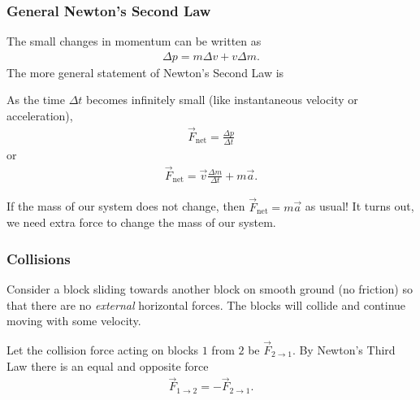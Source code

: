 \documentclass[20pt]{beamer}
\begin{document}
\begin{frame}
	\frametitle{General Newton's Second Law}
	The small changes in momentum can be written as
	\begin{align*}
		\Delta p = m \Delta v + v \Delta m.
	\end{align*}
	The more general statement of Newton's Second Law is
	\begin{theorem}
		As the time $\Delta t$ becomes infinitely small (like instantaneous velocity or acceleration),
		\begin{align*}
			\vec{F}_\mathrm{net} = \frac{\Delta p}{\Delta t}
		\end{align*}
		or
		\begin{align*}
			\vec{F}_\mathrm{net} = \vec{v} \frac{\Delta m}{\Delta t} + m \vec{a}.
		\end{align*}
	\end{theorem}
	If the mass of our system does not change, then $\vec{F}_\mathrm{net} = m \vec{a}$ as usual! It turns out, we need extra force to change the mass of our system.
\end{frame}

\begin{frame}
	\frametitle{Collisions}
	\begin{example}
		Consider a block sliding towards another block on smooth ground (no friction) so that there are no \textit{external} horizontal forces.
		The blocks will collide and continue moving with some velocity.
		\begin{figure}[ht]
			\centering
			\label{fig:collision}
		\end{figure}
		Let the collision force acting on blocks $1$ from $2$ be $\vec{F}_{2\rightarrow 1}$. By Newton's Third Law there is an equal and opposite force
		\begin{align*}
			\vec{F}_{1 \rightarrow 2} = - \vec{F}_{2 \rightarrow 1}.
		\end{align*}
	\end{example}
\end{frame}
\end{document}
